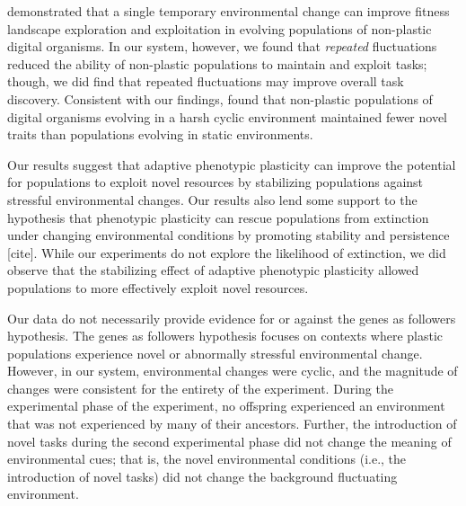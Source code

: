 \cite{nahum_improved_2017} demonstrated that a single temporary environmental change can improve fitness landscape exploration and exploitation in evolving populations of non-plastic digital organisms.
In our system, however, we found that \textit{repeated} fluctuations reduced the ability of non-plastic populations to maintain and exploit tasks; though, we did find that repeated fluctuations may improve overall task discovery. 
Consistent with our findings, \cite{canino-koning_fluctuating_2019} found that non-plastic populations of digital organisms evolving in a harsh cyclic environment maintained fewer novel traits than populations evolving in static environments.

Our results suggest that adaptive phenotypic plasticity can improve the potential for populations to exploit novel resources by stabilizing populations against stressful environmental changes.
Our results also lend some support to the hypothesis that phenotypic plasticity can rescue populations from extinction under changing environmental conditions by promoting stability and persistence [cite].
While our experiments do not explore the likelihood of extinction, we did observe that the stabilizing effect of adaptive phenotypic plasticity allowed populations to more effectively exploit novel resources.

Our data do not necessarily provide evidence for or against the genes as followers hypothesis.
The genes as followers hypothesis focuses on contexts where plastic populations experience novel or abnormally stressful environmental change.
However, in our system, environmental changes were cyclic, and the magnitude of changes were consistent for the entirety of the experiment.
During the experimental phase of the experiment, no offspring experienced an environment that was not experienced by many of their ancestors.
Further, the introduction of novel tasks during the second experimental phase did not change the meaning of environmental cues; that is, the novel environmental conditions (i.e., the introduction of novel tasks) did not change the background fluctuating environment.


